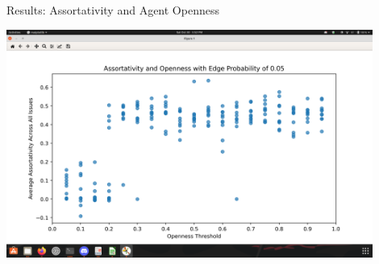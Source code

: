 \documentclass[12pt]{beamer}
\begin{document}
\begin{frame}[c]{Results: Assortativity and Agent Openness}  %

% 




\begin{center}
\includegraphics[width=0.9\textwidth]{images/AssortOpenness.png}
\end{center}

\end{frame}
\end{document}
